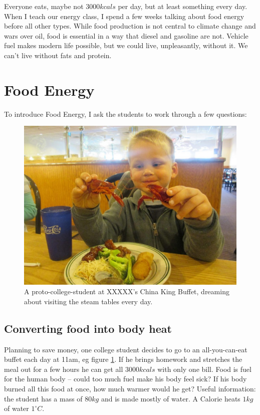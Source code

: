 \documentclass[prb,preprint]{revtex4-2}
\begin{document}
Everyone eats, maybe not $3000 kcals$ per day, but at least something every day.  When I teach our energy class,\cite{Energy_textbook,PFFP} 
I spend a few weeks talking about food energy before all other types.  While food production is not central to climate change and wars over oil, food is essential in a way that diesel and gasoline are not.  Vehicle fuel makes modern life possible, but we could live, unpleasantly, without it.  We can't live without fats and protein.  

\section{Food Energy}

To introduce Food Energy, I ask the students to work through a few questions:

\begin{figure}[h]
\centering
\includegraphics[width=\columnwidth]{at_the_buffet.jpg}
\caption{
A proto-college-student at 
XXXXX's
China King Buffet, dreaming about visiting the steam tables every day. 
}
\label{buffet}
\end{figure}

\subsection{Converting food into body heat}
Planning to save money, one college student decides to go to an all-you-can-eat buffet each day at 11am, eg figure \ref{buffet}.  If he brings homework and stretches the meal out for a few hours he can get all $3000kcals$ with only one bill.  Food is fuel for the human body -- could too much fuel make his body feel sick? If his body burned all this food at once, how much warmer would he get? 
Useful information: the student has a mass of $80kg$ and is made mostly of water.  A Calorie heats $1 kg$ of water $1^{\circ}C$. 
\end{document}
